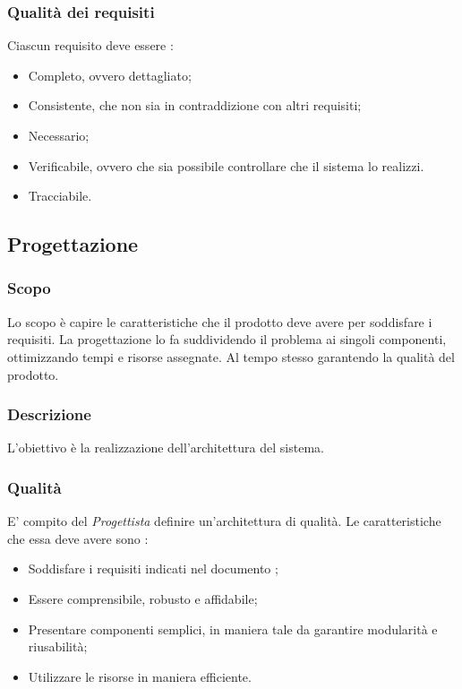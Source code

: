 \subsubsection{Qualità dei requisiti}
Ciascun requisito deve essere :
\begin{itemize}
  \item Completo, ovvero dettagliato;
  \item Consistente, che non sia in contraddizione con altri requisiti;
  \item Necessario;
  \item Verificabile, ovvero che sia possibile controllare che il sistema lo realizzi.
  \item Tracciabile.
\end{itemize}

\subsection{Progettazione}
\subsubsection{Scopo}
Lo scopo è capire le caratteristiche che il prodotto deve avere per soddisfare i requisiti. La progettazione lo fa suddividendo il problema ai singoli componenti, ottimizzando tempi e risorse assegnate. Al tempo stesso garantendo la qualità del prodotto.

\subsubsection{Descrizione}
L’obiettivo è la realizzazione dell’architettura del sistema.

\subsubsection{Qualità}
E’ compito del \textit{Progettista} definire un’architettura di qualità. Le caratteristiche che essa deve avere sono :
\begin{itemize}
  \item Soddisfare i requisiti indicati nel documento \AdR;
  \item Essere comprensibile, robusto e affidabile;
  \item Presentare componenti semplici, in maniera tale da garantire modularità e riusabilità;
  \item Utilizzare le risorse in maniera efficiente.
\end{itemize}

